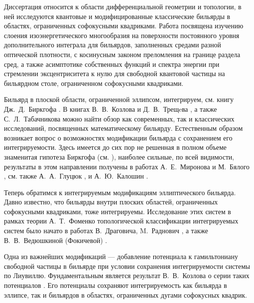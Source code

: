 
{\actuality} 
Диссертация относится к области дифференциальной геометрии и топологии, в ней 
исследуются квантовые и модифицированные классические бильярды в областях, ограниченных софокусными квадриками.
Работа посвящена изучению слоения изоэнергетического многообразия на поверхности постоянного уровня дополнительного интеграла для бильярдов, заполненных средами разной оптической плотности, с косинусным законом преломления на границе раздела сред, а также асимптотике собственных функций и спектра энергии при стремлении эксцентриситета к нулю для свободной квантовой частицы на бильярдном столе, ограниченном софокусными квадриками.

Бильярд в плоской области, ограниченной эллипсом, интегрируем, см. книгу Дж.~Д.~Биркгофа \autocite{birkhoff1999}. 
В книгах В.~В.~Козлова и Д.~В.~Трещeва \autocite{kozlov1991genetic}, а также С.~Л.~Табачникова \autocite{tabachnikov2011} можно найти обзор как современных, так и классических исследований, посвященных математическому бильярду.
Естественным образом возникает вопрос о возможностях модификации бильярда с сохранением его интегрируемости.
Здесь имеется до сих пор не решенная в полном объеме знаменитая гипотеза Биркгофа (см. \autocite{poritsky1950}), наиболее сильные, по всей видимости, результаты в этом направлении получены в работах А.~Е.~Миронова и М.~Бялого \autocite{bialy2017angular,bm2019,bm2020}, см. также А.~А.~Глуцюк \autocite{glutsyuk2018two}, и  А.~Ю.~Калошин \autocite{avila2016integrable,kaloshin2018local}.

Теперь обратимся к интегрируемым модификациям эллиптического бильярда. 
Давно известно, что бильярды внутри плоских областей, ограниченных софокусными квадриками, тоже интегрируемы.
Исследование этих систем в рамках теории А.~Т.~Фоменко топологической классификации интегрируемых систем было начато в работах В.~Драговича, M.~Раднович \autocite{dragovic2009bifurcations,dragovich2010integrable}, а также В.~В.~Ведюшкиной
(Фокичевой) \autocite{fokicheva2012description,fokicheva2014confocal,fokicheva2014classification,fokicheva2015topological,vedyushkina2019invariants}.

Одна из важнейших модификаций --- добавление потенциала к гамильтониану свободной частицы в бильярде  при условии сохранения интегрируемости системы по Лиувиллю.
Фундаментальным является результат В.~В.~Козлова о серии таких потенциалов \autocite{Kozlov}. Его потенциалы сохраняют интегрируемость как бильярда в эллипсе, так и бильярдов в областях, ограниченных дугами софокусных квадрик.

